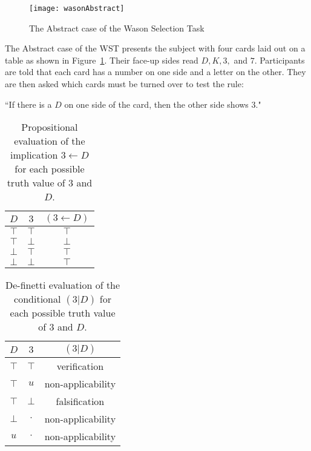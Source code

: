 \begin{figure}
\begin{center}
\texttt{[image: wasonAbstract]}
\caption{The Abstract case of the Wason Selection Task}
\label{fig:wst}
\end{center}

\end{figure}

The Abstract case of the WST presents the subject with four cards laid out on a table as shown in Figure~\ref{fig:wst}. Their face-up sides read $D, K, 3,$ and $7$. Participants are told that each card has a number on one side and a letter on the other. They are then asked which cards must be turned over to test the rule:
\begin{center}
``If there is a $D$ on one side of the card, then the other side shows $3$."
\end{center} 

\begin{table}
\begin{center}


\begin{tabular}{ c c c}
  \textbf{$D$}&  \textbf{$3$}& \textbf{$(3\leftarrow D)$} \\ 
  \hline
 $\top$ & $\top$ & $\top$\\  
 $\top$ & $\bot$ & $\bot$\\  
 $\bot$ & $\top$ & $\top$\\
 $\bot$ & $\bot$ & $\top$
\end{tabular}
\caption{Propositional evaluation of the implication $3 \leftarrow D$ for each possible truth value of $3$ and $D$.}
\label{tbl:wst_impl}
\end{center}
\end{table}

\begin{table}
\begin{center}


\begin{tabular}{ c c c}
  \textbf{$D$}&  \textbf{$3$}& \textbf{$(3|D)$} \\ 
  \hline
 $\top$ & $\top$ & verification\\  
  $\top$ & $u$ & non-applicability\\ 
 $\top$ & $\bot$ & falsification\\  
 $\bot$ & $\cdot$ & non-applicability\\
 $u$ & $\cdot$ & non-applicability
\end{tabular}
\caption{De-finetti evaluation of the conditional $(3|D)$ for each possible truth value of $3$ and $D$.}
\label{tbl:wst_classical}
\end{center}
\end{table}

